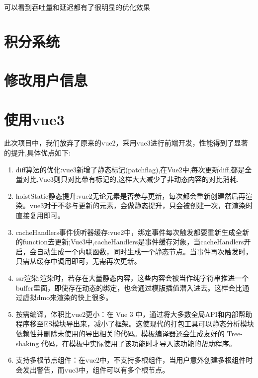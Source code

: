 可以看到吞吐量和延迟都有了很明显的优化效果
\section{积分系统}

\section{修改用户信息}


\section{使用vue3}
此次项目中，我们放弃了原来的vue2，采用vue3进行前端开发，性能得到了显著的提升,具体优点如下:
\begin{enumerate}
	\item {diff算法的优化}:vue3新增了静态标记(patchflag),在Vue2中,每次更新diff,都是全量对比,Vue3则只对比带有标记的,这样大大减少了非动态内容的对比消耗.
	\item {hoistStatic静态提升}:vue2无论元素是否参与更新，每次都会重新创建然后再渲染。vue3对于不参与更新的元素，会做静态提升，只会被创建一次，在渲染时直接复用即可。
	\item {cacheHandlers事件侦听器缓存}:vue2中，绑定事件每次触发都要重新生成全新的function去更新;Vue3中,cacheHandlers是事件缓存对象，当cacheHandlers开启，会自动生成一个内联函数，同时生成一个静态节点。当事件再次触发时，只需从缓存中调用即可，无需再次更新。
	\item {ssr渲染}:渲染时，若存在大量静态内容，这些内容会被当作纯字符串推进一个buffer里面，即使存在动态的绑定，也会通过模版插值潜入进去。这样会比通过虚拟dmo来渲染的快上很多。
	\item {按需编译，体积比vue2更小}：在 Vue 3 中，通过将大多数全局API和内部帮助程序移至ES模块导出来，减小了框架。这使现代的打包工具可以静态分析模块依赖性并删除未使用的导出相关的代码。模板编译器还会生成友好的 Tree-shaking 代码，在模板中实际使用了该功能时才导入该功能的帮助程序。
	\item {支持多根节点组件}：在vue2中，不支持多根组件，当用户意外创建多根组件时会发出警告，而vue3中，组件可以有多个根节点。
\end{enumerate}